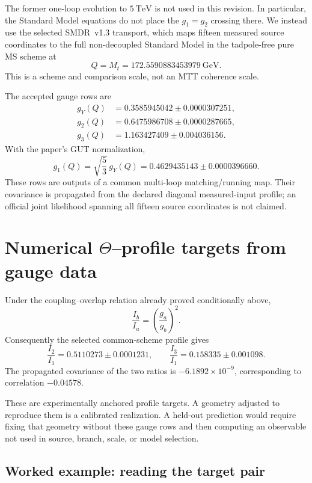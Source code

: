 \documentclass[11pt]{article}
\begin{document}
The former one-loop evolution to $5~\mathrm{TeV}$ is not used in this
revision.  In particular, the Standard Model equations do not place the
$g_1=g_2$ crossing there.  We instead use the selected SMDR~v1.3 transport,
which maps fifteen measured source coordinates to the full non-decoupled
Standard Model in the tadpole-free pure $\overline{\mathrm{MS}}$ scheme at
\[
 Q=M_t=172.5590883453979~\mathrm{GeV}.
\]
This is a scheme and comparison scale, not an MTT coherence scale.

The accepted gauge rows are
\begin{align}
 g_Y(Q)&=0.3585945042\pm0.0000307251,\\
 g_2(Q)&=0.6475986708\pm0.0000287665,\\
 g_3(Q)&=1.163427409\pm0.004036156.
\end{align}
With the paper's GUT normalization,
\[
 g_1(Q)=\sqrt{\frac53}\,g_Y(Q)
       =0.4629435143\pm0.0000396660.
\]
These rows are outputs of a common multi-loop matching/running map.  Their
covariance is propagated from the declared diagonal measured-input profile;
an official joint likelihood spanning all fifteen source coordinates is not
claimed.

\section{Numerical \texorpdfstring{$\Theta$}{Theta}--profile targets from gauge data}

Under the coupling--overlap relation already proved conditionally above,
\[
 \frac{I_b}{I_a}=\left(\frac{g_a}{g_b}\right)^2.
\]
Consequently the selected common-scheme profile gives
\begin{equation}
\boxed{
 \frac{I_2}{I_1}=0.5110273\pm0.0001231,
 \qquad
 \frac{I_3}{I_1}=0.158335\pm0.001098.
}
\label{eq:targets}
\end{equation}
The propagated covariance of the two ratios is
$-6.1892\times10^{-9}$, corresponding to correlation $-0.04578$.

These are experimentally anchored profile targets.  A geometry adjusted to
reproduce them is a calibrated realization.  A held-out prediction would
require fixing that geometry without these gauge rows and then computing an
observable not used in source, branch, scale, or model selection.

\subsection{Worked example: reading the target pair}
\end{document}
